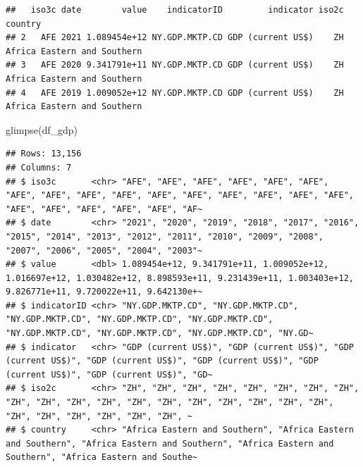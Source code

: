 \documentclass[
  12pt,
  oneside]{book}
\newenvironment{Shaded}{\begin{snugshade}}{\end{snugshade}}
\newcommand{\AttributeTok}[1]{\textcolor[rgb]{0.77,0.63,0.00}{#1}}
\newcommand{\CommentTok}[1]{\textcolor[rgb]{0.56,0.35,0.01}{\textit{#1}}}
\newcommand{\DecValTok}[1]{\textcolor[rgb]{0.00,0.00,0.81}{#1}}
\newcommand{\FunctionTok}[1]{\textcolor[rgb]{0.00,0.00,0.00}{#1}}
\newcommand{\NormalTok}[1]{#1}
\newcommand{\OtherTok}[1]{\textcolor[rgb]{0.56,0.35,0.01}{#1}}
\newcommand{\StringTok}[1]{\textcolor[rgb]{0.31,0.60,0.02}{#1}}
\theoremstyle{definition}
\theoremstyle{definition}
\theoremstyle{definition}
\theoremstyle{definition}
\theoremstyle{remark}
\begin{document}
\begin{Shaded}
\end{Shaded}

\begin{verbatim}
##   iso3c date        value    indicatorID         indicator iso2c                     country
## 2   AFE 2021 1.089454e+12 NY.GDP.MKTP.CD GDP (current US$)    ZH Africa Eastern and Southern
## 3   AFE 2020 9.341791e+11 NY.GDP.MKTP.CD GDP (current US$)    ZH Africa Eastern and Southern
## 4   AFE 2019 1.009052e+12 NY.GDP.MKTP.CD GDP (current US$)    ZH Africa Eastern and Southern
\end{verbatim}

\begin{Shaded}
\begin{Highlighting}[]
\FunctionTok{glimpse}\NormalTok{(df\_gdp)}
\end{Highlighting}
\end{Shaded}

\begin{verbatim}
## Rows: 13,156
## Columns: 7
## $ iso3c       <chr> "AFE", "AFE", "AFE", "AFE", "AFE", "AFE", "AFE", "AFE", "AFE", "AFE", "AFE", "AFE", "AFE", "AFE", "AFE", "AFE", "AFE", "AFE", "AFE", "AFE", "AFE", "AF~
## $ date        <chr> "2021", "2020", "2019", "2018", "2017", "2016", "2015", "2014", "2013", "2012", "2011", "2010", "2009", "2008", "2007", "2006", "2005", "2004", "2003"~
## $ value       <dbl> 1.089454e+12, 9.341791e+11, 1.009052e+12, 1.016697e+12, 1.030482e+12, 8.898593e+11, 9.231439e+11, 1.003403e+12, 9.826771e+11, 9.720022e+11, 9.642130e+~
## $ indicatorID <chr> "NY.GDP.MKTP.CD", "NY.GDP.MKTP.CD", "NY.GDP.MKTP.CD", "NY.GDP.MKTP.CD", "NY.GDP.MKTP.CD", "NY.GDP.MKTP.CD", "NY.GDP.MKTP.CD", "NY.GDP.MKTP.CD", "NY.GD~
## $ indicator   <chr> "GDP (current US$)", "GDP (current US$)", "GDP (current US$)", "GDP (current US$)", "GDP (current US$)", "GDP (current US$)", "GDP (current US$)", "GD~
## $ iso2c       <chr> "ZH", "ZH", "ZH", "ZH", "ZH", "ZH", "ZH", "ZH", "ZH", "ZH", "ZH", "ZH", "ZH", "ZH", "ZH", "ZH", "ZH", "ZH", "ZH", "ZH", "ZH", "ZH", "ZH", "ZH", "ZH", ~
## $ country     <chr> "Africa Eastern and Southern", "Africa Eastern and Southern", "Africa Eastern and Southern", "Africa Eastern and Southern", "Africa Eastern and Southe~
\end{verbatim}
\end{document}
